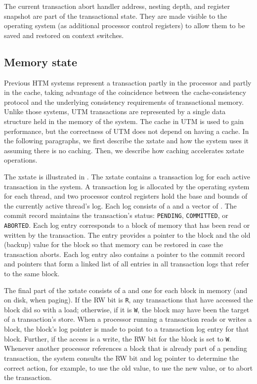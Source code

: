 The current transaction abort handler address, nesting depth, and
register snapshot are part of the transactional state.  They are made
visible to the operating system (as additional processor control
registers) to allow them to be saved and restored on context switches.

\subsection{Memory state}

Previous HTM systems \cite{Knight86,HerlihyMo93} represent a
transaction partly in the processor and partly in the cache, taking
advantage of the coincidence between the cache-consistency protocol
and the underlying consistency requirements of transactional memory.
Unlike those systems, UTM transactions are represented by a single
 data structure held in the memory of the system.  The
cache in UTM is used to gain performance, but the correctness of
UTM does not depend on having a cache.  In the following
paragraphs, we first describe the xstate and how the system uses it
assuming there is no caching.  Then, we describe how caching
accelerates xstate operations.

The xstate is illustrated in .  The xstate
contains a transaction log for each active transaction in the system.
A transaction log is allocated by the operating system for each
thread, and two processor control registers hold the base and bounds
of the currently active thread's log.  Each log consists of a
 and a vector of .  The commit
record maintains the transaction's status: \texttt{PENDING},
\texttt{COMMITTED}, or \texttt{ABORTED}\@.  Each log entry corresponds
to a block of memory that has been read or written by the transaction.
The entry provides a pointer to the block and the old (backup) value
for the block so that memory can be restored in case the transaction
aborts.  Each log entry also contains a pointer to the commit record
and pointers that form a linked list of all entries in all transaction
logs that refer to the same block.

The final part of the xstate consists of a  and one
 for each block in memory (and on disk, when paging).  If
the RW bit is \texttt{R}, any transactions that have accessed the
block did so with a load; otherwise, if it is \texttt{W}, the block
may have been the target of a transaction's store.  When a processor
running a transaction reads or writes a block, the block's log pointer
is made to point to a transaction log entry for that block.  Further,
if the access is a write, the RW bit for the block is set to
\texttt{W}\@.  Whenever another processor references a block that is
already part of a pending transaction, the system consults the RW bit
and log pointer to determine the correct action, for example, to use
the old value, to use the new value, or to abort the transaction.

